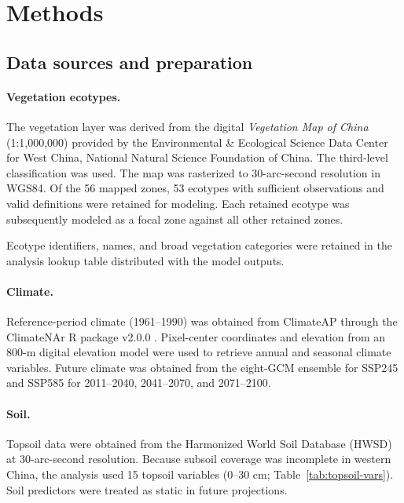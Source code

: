 \documentclass[11pt]{article}
\begin{document}
\section{Methods}

\subsection{Data sources and preparation}

\paragraph{Vegetation ecotypes.}
The vegetation layer was derived from the digital \textit{Vegetation Map of China} (1:1,000,000) provided by the Environmental \& Ecological Science Data Center for West China, National Natural Science Foundation of China. The third-level classification was used. The map was rasterized to 30-arc-second resolution in WGS84. Of the 56 mapped zones, 53 ecotypes with sufficient observations and valid definitions were retained for modeling. Each retained ecotype was subsequently modeled as a focal zone against all other retained zones.

Ecotype identifiers, names, and broad vegetation categories were retained in
the analysis lookup table distributed with the model outputs.

\paragraph{Climate.}
Reference-period climate (1961--1990) was obtained from ClimateAP through the ClimateNAr R package v2.0.0 \citep{wang2017}. Pixel-center coordinates and elevation from an 800-m digital elevation model were used to retrieve annual and seasonal climate variables. Future climate was obtained from the eight-GCM ensemble for SSP245 and SSP585 for 2011--2040, 2041--2070, and 2071--2100.

\paragraph{Soil.}
Topsoil data were obtained from the Harmonized World Soil Database (HWSD) \citep{fischer2012hwsd} at 30-arc-second resolution. Because subsoil coverage was incomplete in western China, the analysis used 15 topsoil variables (0--30 cm; Table~\ref{tab:topsoil-vars}). Soil predictors were treated as static in future projections.
\end{document}
